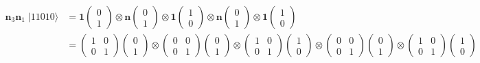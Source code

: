 \documentclass{article}
\begin{document}
\begin{align*}
\bm{n}_3\bm{n}_1 \; |11010\rangle
  &= \bm{1}
     \begin{pmatrix}0\\1\end{pmatrix}
     \otimes
     \bm{n}
     \begin{pmatrix}0\\1\end{pmatrix}
     \otimes
     \bm{1}
     \begin{pmatrix}1\\0\end{pmatrix}
     \otimes
     \bm{n}
     \begin{pmatrix}0\\1\end{pmatrix}
     \otimes
     \bm{1}
     \begin{pmatrix}1\\0\end{pmatrix}\\
  &= \begin{pmatrix}1 & 0\\0 & 1\end{pmatrix}
     \begin{pmatrix}0\\1\end{pmatrix}
     \otimes
     \begin{pmatrix}0 & 0\\0 & 1\end{pmatrix}
     \begin{pmatrix}0\\1\end{pmatrix}
     \otimes
     \begin{pmatrix}1 & 0\\0 & 1\end{pmatrix}
     \begin{pmatrix}1\\0\end{pmatrix}
     \otimes
     \begin{pmatrix}0 & 0\\0 & 1\end{pmatrix}
     \begin{pmatrix}0\\1\end{pmatrix}
     \otimes
     \begin{pmatrix}1 & 0\\0 & 1\end{pmatrix}
     \begin{pmatrix}1\\0\end{pmatrix}\\

\end{align*}
\end{document}

